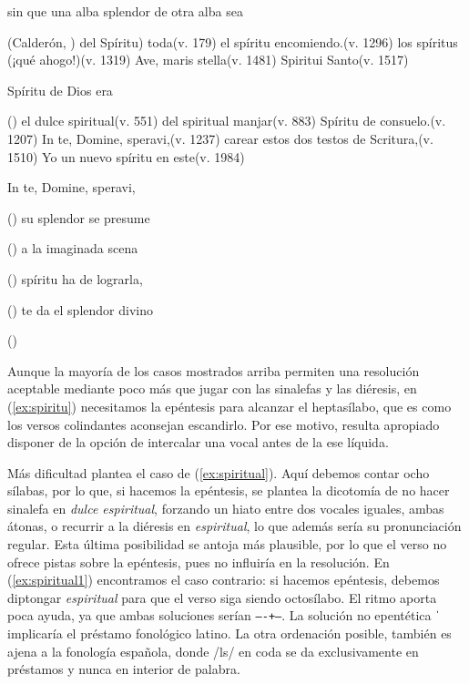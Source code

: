 \begin{exe}
	\ex\begin{xlist}
		\ex\label{ex:splendor}sin que una alba splendor de otra alba sea\\\strut\hfill(Calderón, )		
		\ex\label{ex:spiritu}del Spíritu) toda\hfill(v. 179)	
		\ex\label{ex:splendor1}el spíritu encomiendo.\hfill(v. 1296)	
		\ex\label{ex:spiritus}los spíritus (¡qué ahogo!)\hfill(v. 1319)
		\ex\label{ex:stella}Ave, maris stella\hfill(v. 1481)	
		\ex\label{ex:spiritui}Spiritui Santo\hfill(v. 1517)
	\end{xlist}
	\ex\begin{xlist}
		\ex\label{ex:spiritu1}Spíritu de Dios era\strut\hfill(\citetitle[246]{calderon_pernaso})	
		\ex\label{ex:spiritual}el dulce spiritual\hfill(v. 551)	
		\ex\label{ex:spiritual1}del spiritual manjar\hfill(v. 883)	
		\ex\label{ex:spiritu2}Spíritu de consuelo.\hfill(v. 1207)
		\ex\label{ex:speravi2}In te, Domine, speravi,\hfill(v. 1237)
		\ex\label{ex:scitura}carear estos dos testos de Scritura,\hfill(v. 1510)
		\ex\label{ex:spiritu3}Yo un nuevo spíritu en este\hfill(v. 1984)
	\end{xlist}
	\ex\label{ex:speravi}In te, Domine, speravi,\strut\hfill()
	\ex\label{ex:splendor2}su splendor se presume\strut\hfill()
	\ex\label{ex:scena}a la imaginada scena\strut\hfill()
	\ex\label{ex:spiritu4}spíritu ha de lograrla,\strut\hfill()
	\ex\label{ex:splendor3}te da el splendor divino\strut\hfill()
\end{exe}
Aunque la mayoría de los casos mostrados arriba permiten una resolución aceptable mediante poco más que jugar con las sinalefas y las diéresis, en (\ref{ex:spiritu}) necesitamos la epéntesis para alcanzar el heptasílabo, que es como los versos colindantes aconsejan escandirlo. Por ese motivo, resulta apropiado disponer de la opción de intercalar una vocal antes de la ese líquida.

Más dificultad plantea el caso de (\ref{ex:spiritual}). Aquí debemos contar ocho sílabas, por lo que, si hacemos la epéntesis, se plantea la dicotomía de no hacer sinalefa en \textit{dulce espiritual}, forzando un hiato entre dos vocales iguales, ambas átonas, o recurrir a la diéresis en \textit{espiritual}, lo que además sería su pronunciación regular. Esta última posibilidad se antoja más plausible, por lo que el verso no ofrece pistas sobre la epéntesis, pues no influiría en la resolución. En (\ref{ex:spiritual1}) encontramos el caso contrario: si hacemos epéntesis, debemos diptongar \textit{espiritual} para que el verso siga siendo octosílabo. El ritmo aporta poca ayuda, ya que ambas soluciones serían \texttt{----+--}. La solución no epentética ˈ implicaría el préstamo fonológico latino. La otra ordenación posible,  también es ajena a la fonología española, donde /ls/ en coda se da exclusivamente en préstamos y nunca en interior de palabra.

